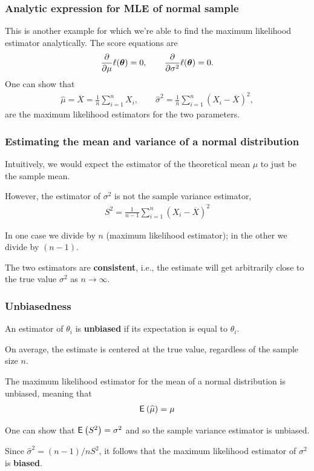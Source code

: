 \documentclass{beamer}
\begin{document}
\begin{frame}
\frametitle{Analytic expression for MLE of normal sample}
This is another example for which we're able to find the maximum likelihood estimator analytically. The \alert{score equations} are
\begin{align*}
\frac{\partial}{\partial \mu} \ell(\boldsymbol {\theta})=0 , \qquad \frac{\partial}{\partial \sigma^2} \ell(\boldsymbol {\theta})=0.
\end{align*}
One can show that 
\begin{align*}
\hat{\mu}=\overline{X}=\frac{1}{n} \sum_{i=1}^n X_i, \qquad \hat{\sigma}^2=\frac{1}{n}\sum_{i=1}^n (X_i-\overline{X})^2,
\end{align*}
are the maximum likelihood estimators for the two parameters.

\end{frame}

\begin{frame}
\frametitle{Estimating the mean and variance of a normal distribution}
\bi
\item Intuitively, we would expect the estimator of the theoretical mean $\mu$ to just be the sample mean. 
\item However, the estimator of $\sigma^2$ is not the sample variance estimator,
\begin{align*}
S^2=\frac{1}{n-1} \sum_{i=1}^n (X_i-\overline{X})^2
\end{align*}
\item In one case we divide by $n$ (maximum likelihood estimator); in the other we divide by $(n -1)$. 
\item The two estimators are \textbf{consistent}, i.e., the estimate will get arbitrarily close to the true value $\sigma^2$ as $n \to \infty$.
\ei
\end{frame}

\begin{frame}
\frametitle{Unbiasedness}
\bi
\item An estimator of $\theta_i$ is \textbf{unbiased} if its expectation is equal to $\theta_i$.
\bi \item On average, the estimate is centered at the true value, regardless of the sample size $n$.\ei
\item The maximum likelihood estimator for the mean of a normal distribution is \alert{unbiased}, meaning that
\begin{align*}
{\mathsf E}_{}\left(\widehat{\mu}\right)=\mu
\end{align*}
\item One can show that ${\mathsf E}_{}\left(S^2\right)=\sigma^2$ and so the sample variance estimator is unbiased.
\item Since $\hat{\sigma}^2=(n-1)/n S^2$, it follows that the maximum likelihood estimator of $\sigma^2$ is \textbf{biased}. 
\ei
\end{frame}
\end{document}

